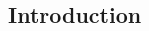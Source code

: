 \documentclass[fleqn,a4paper,10pt]{article}
\begin{document}
\vspace{18pt} %


\begin{multicols}{2}

\section{Introduction}



\end{multicols}
\end{document}
